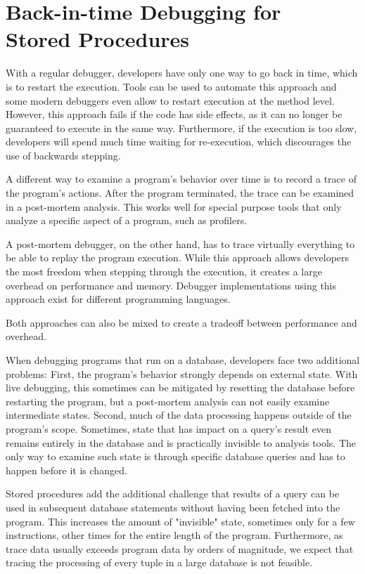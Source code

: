\documentclass[english]{sig-alternate-05-2015}
\newcommand{\todo}[2][]{\pdfmargincomment[author={#1}]{#2}}
\begin{document}
\section{Back-in-time Debugging for\\ Stored Procedures}
\label{sec:prototype}

With a regular debugger, developers have only one way to go back in time, which is to restart the execution.
Tools can be used to automate this approach\todo{cite} and some modern debuggers even allow to restart execution at the method level\todo{cite}.
However, this approach fails if the code has side effects, as it can no longer be guaranteed to execute in the same way.
Furthermore, if the execution is too slow, developers will spend much time waiting for re-execution, which discourages the use of backwards stepping.

A different way to examine a program's behavior over time is to record a trace of the program's actions.
After the program terminated, the trace can be examined in a post-mortem analysis.
This works well for special purpose tools that only analyze a specific aspect of a program, such as profilers.

A post-mortem debugger, on the other hand, has to trace virtually everything to be able to replay the program execution.
While this approach allows developers the most freedom when stepping through the execution, it creates a large overhead on performance and memory.
Debugger implementations using this approach exist for different programming languages.

Both approaches can also be mixed to create a tradeoff between performance and overhead\todo{cite}.

When debugging programs that run on a database, developers face two additional problems:
First, the program's behavior strongly depends on external state.
With live debugging, this sometimes can be mitigated by resetting the database before restarting the program, but a post-mortem analysis can not easily examine intermediate states.
Second, much of the data processing happens outside of the program's scope.
Sometimes, state that has impact on a query's result even remains entirely in the database and is practically invisible to analysis tools.
The only way to examine such state is through specific database queries and has to happen before it is changed.

Stored procedures add the additional challenge that results of a query can be used in subsequent database statements without having been fetched into the program.
This increases the amount of "invisible" state, sometimes only for a few instructions, other times for the entire length of the program.
Furthermore, as trace data usually exceeds program data by orders of magnitude, we expect that tracing the processing of every tuple in a large database is not feasible.
\end{document}
